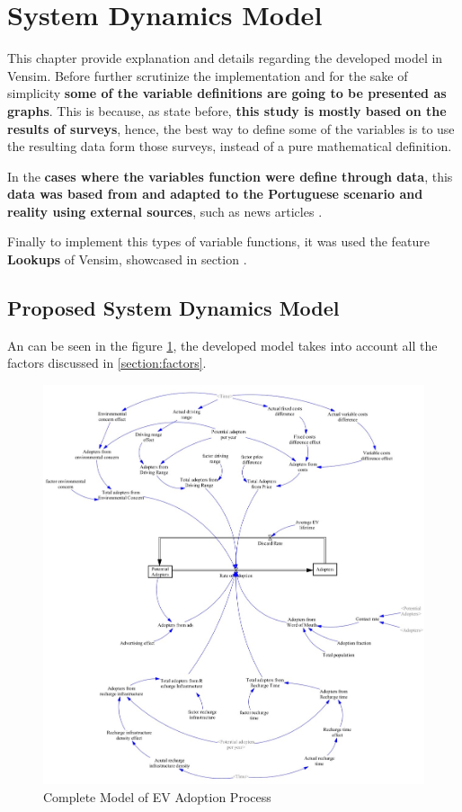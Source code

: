 \section{System Dynamics Model} \label{section:model}
This chapter provide explanation and details regarding the developed model in Vensim. Before further scrutinize the implementation and for the sake of simplicity \textbf{some of the variable definitions are going to be presented as graphs}. This is because, as state before, \textbf{this study is mostly based on the results of surveys}, hence, the best way to define some of the variables is to use the resulting data form those surveys, instead of a pure mathematical definition.

In the \textbf{cases where the variables function were define through data}, this \textbf{data was based from \cite{thesis-base, pedro-report} and adapted to the Portuguese scenario and reality using external sources}, such as news articles \cite{dv-news-article, eco-news-article, obs-news-article, uve-news-article}.

Finally to implement this types of variable functions, it was used the feature \textbf{Lookups} of Vensim, showcased in section \cite{vensim-youtube-lookups}.

\subsection{Proposed System Dynamics Model}
An can be seen in the figure \ref{fig:vensim-model}, the developed model takes into account all the factors discussed in \ref{section:factors}.

\begin{figure}[htbp]
\centerline{\includegraphics[width=1\linewidth]{img/vensim-model.jpg}}
\caption{Complete Model of EV Adoption Process}
\label{fig:vensim-model}
\end{figure}

